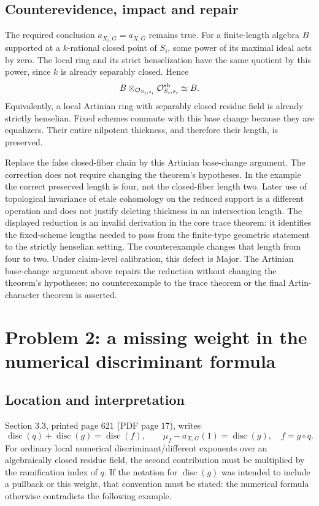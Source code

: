 \documentclass[10pt]{article}
\begin{document}
\subsection*{Counterevidence, impact and repair}
The required conclusion \(a_{X_i,G}=a_{X,G}\) remains true. For a finite-length algebra \(B\) supported at a \(k\)-rational closed point of \(S_i\), some power of its maximal ideal acts by zero. The local ring and its strict henselization have the same quotient by this power, since \(k\) is already separably closed. Hence \[B\otimes_{\mathcal O_{S_i,s_i}}\mathcal O^{\rm sh}_{S_i,s_i}
 \simeq B.\] Equivalently, a local Artinian ring with separably closed residue field is already strictly henselian. Fixed schemes commute with this base change because they are equalizers. Their entire nilpotent thickness, and therefore their length, is preserved.\par
Replace the false closed-fiber chain by this Artinian base-change argument. The correction does not require changing the theorem’s hypotheses. In the example the correct preserved length is four, not the closed-fiber length two. Later use of topological invariance of etale cohomology on the reduced support is a different operation and does not justify deleting thickness in an intersection length. The displayed reduction is an invalid derivation in the core trace theorem: it identifies the fixed-scheme lengths needed to pass from the finite-type geometric statement to the strictly henselian setting. The counterexample changes that length from four to two. Under claim-level calibration, this defect is Major. The Artinian base-change argument above repairs the reduction without changing the theorem’s hypotheses; no counterexample to the trace theorem or the final Artin-character theorem is asserted.\par
\section*{Problem 2: a missing weight in the numerical discriminant formula}
\subsection*{Location and interpretation}
Section 3.3, printed page 621 (PDF page 17), writes \[\operatorname{disc}(q)+\operatorname{disc}(g)
       =\operatorname{disc}(f),\qquad
 \mu_f-a_{X,G}(1)=\operatorname{disc}(g),
 \quad f=g\circ q.\] For ordinary local numerical discriminant/different exponents over an algebraically closed residue field, the second contribution must be multiplied by the ramification index of \(q\). If the notation for \(\operatorname{disc}(g)\) was intended to include a pullback or this weight, that convention must be stated: the numerical formula otherwise contradicts the following example.\par
\end{document}
